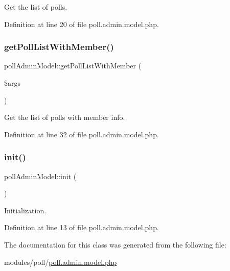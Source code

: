 Get the list of polls. 



Definition at line 20 of file poll.\+admin.\+model.\+php.

\hypertarget{classpollAdminModel_a5fcc86af506f4a18e0f5c3c0bde0c0e6}{}\label{classpollAdminModel_a5fcc86af506f4a18e0f5c3c0bde0c0e6} 
\subsubsection{\texorpdfstring{get\+Poll\+List\+With\+Member()}{getPollListWithMember()}}
{\footnotesize\ttfamily poll\+Admin\+Model\+::get\+Poll\+List\+With\+Member (\begin{DoxyParamCaption}\item[{}]{\$args }\end{DoxyParamCaption})}



Get the list of polls with member info. 



Definition at line 32 of file poll.\+admin.\+model.\+php.

\hypertarget{classpollAdminModel_ab414abeed028a478983ac6f493340e87}{}\label{classpollAdminModel_ab414abeed028a478983ac6f493340e87} 
\subsubsection{\texorpdfstring{init()}{init()}}
{\footnotesize\ttfamily poll\+Admin\+Model\+::init (\begin{DoxyParamCaption}{ }\end{DoxyParamCaption})}



Initialization. 



Definition at line 13 of file poll.\+admin.\+model.\+php.



The documentation for this class was generated from the following file\+:\begin{DoxyCompactItemize}
\item 
modules/poll/\hyperlink{poll_8admin_8model_8php}{poll.\+admin.\+model.\+php}\end{DoxyCompactItemize}
